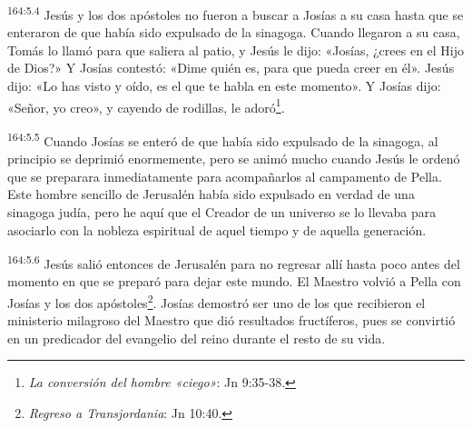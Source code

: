 \par
\textsuperscript{164:5.4} Jesús y los dos apóstoles no fueron a buscar a Josías a su casa hasta que se enteraron de que había sido expulsado de la sinagoga. Cuando llegaron a su casa, Tomás lo llamó para que saliera al patio, y Jesús le dijo: «Josías, ¿crees en el Hijo de Dios?» Y Josías contestó: «Dime quién es, para que pueda creer en él». Jesús dijo: «Lo has visto y oído, es el que te habla en este momento». Y Josías dijo: «Señor, yo creo», y cayendo de rodillas, le adoró\footnote{\textit{La conversión del hombre «ciego»}: Jn 9:35-38.}.

\par
\textsuperscript{164:5.5} Cuando Josías se enteró de que había sido expulsado de la sinagoga, al principio se deprimió enormemente, pero se animó mucho cuando Jesús le ordenó que se preparara inmediatamente para acompañarlos al campamento de Pella. Este hombre sencillo de Jerusalén había sido expulsado en verdad de una sinagoga judía, pero he aquí que el Creador de un universo se lo llevaba para asociarlo con la nobleza espiritual de aquel tiempo y de aquella generación.

\par
\textsuperscript{164:5.6} Jesús salió entonces de Jerusalén para no regresar allí hasta poco antes del momento en que se preparó para dejar este mundo. El Maestro volvió a Pella con Josías y los dos apóstoles\footnote{\textit{Regreso a Transjordania}: Jn 10:40.}. Josías demostró ser uno de los que recibieron el ministerio milagroso del Maestro que dió resultados fructíferos, pues se convirtió en un predicador del evangelio del reino durante el resto de su vida.